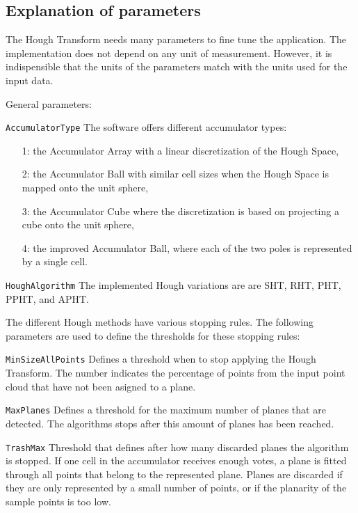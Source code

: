 \documentclass{InsightArticle}
\newcommand{\X}{XXXXXXXXXXXXX}
\begin{document}
\newenvironment{liste}[2][\rm]{\begin{list}{}{\settowidth{\labelwidth}{{#1#2}}
  \setlength{\leftmargin}{\labelwidth}\addtolength{\leftmargin}{\labelsep}
    \addtolength{\leftmargin}{0ex}%
      \setlength{\parsep}{.5ex plus0.2ex minus 0.2ex}%
        \setlength{\itemsep}{1ex}%
          \renewcommand{\makelabel}[1]{{#1##1\hfill}}}}
            {\end{list}}%

\subsection{Explanation of parameters}

The Hough Transform needs many parameters to fine tune the application. The
implementation does not depend on any unit of measurement. However, it is
indispensible that the units of the parameters match with the units used for the input data.

General parameters:
\begin{liste}{\X}
\item[\texttt{AccumulatorType}] The software offers different accumulator
types: 
\begin{enumerate}
\item[1:] the Accumulator Array with a linear discretization of the Hough Space,
\item[2:] the Accumulator Ball with similar cell sizes when the Hough Space is mapped
onto the unit sphere, 
\item[3:] the Accumulator Cube where the discretization is based
on projecting a cube onto the unit sphere, 
\item[4:] the improved Accumulator Ball,
where each of the two poles is represented by a single cell.
\end{enumerate}
\item[\texttt{HoughAlgorithm}] The implemented Hough variations are are SHT,
RHT, PHT, PPHT, and APHT.
\end{liste}

The different Hough methods have various stopping rules. The following
parameters are used to define the thresholds for these stopping rules:
\begin{liste}{\X}
\item[\texttt{MinSizeAllPoints}] Defines a threshold when to stop applying
the Hough Transform. The number indicates the percentage of points from the
input point cloud that have not been asigned to a plane.
\item[\texttt{MaxPlanes}] Defines a threshold for the maximum number of planes that
are detected.
The algorithms stops after this amount of planes has been reached.
\item[\texttt{TrashMax}] Threshold that defines after how many discarded
planes the algorithm is stopped. If one cell in the accumulator receives enough
votes, a plane is fitted through all points that
belong to the represented plane. Planes are discarded if they are only
represented by a small number of points, or if the planarity of the sample
points is too low.
\end{liste}
\end{document}
